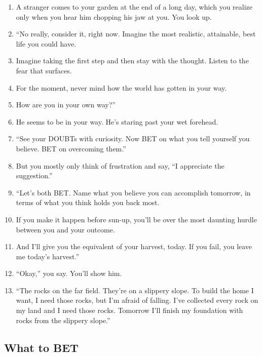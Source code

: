 \documentclass[
]{book}
\providecommand{\tightlist}{%
  \setlength{\itemsep}{0pt}\setlength{\parskip}{0pt}}
\begin{document}
\begin{enumerate}
\def\labelenumi{\arabic{enumi}.}
\setcounter{enumi}{9}
\tightlist
\item
  A stranger comes to your garden at the end of a long day, which you realize only when you hear him chopping his
  jaw at you. You look up.
\item
  ``No really, consider it, right now. Imagine the most realistic,
  attainable, best life you could have.
\item
  Imagine taking the first step and then stay with the thought. Listen to
  the fear that surfaces.
\item
  For the moment, never mind how the world has gotten in your way.
\item
  How are you in your own way?''
\item
  He seems to be in your way. He's staring past your wet forehead.
\item
  ``See your DOUBTs with curiosity. Now BET on what you tell yourself
  you believe. BET on overcoming them.''
\item
  But you mostly only think of frustration and say, ``I appreciate the
  suggestion.''
\item
  ``Let's both BET. Name what you believe you can accomplish
  tomorrow, in terms of what you think holds you back most.
\item
  If you make it happen before sun-up, you'll be over the most daunting
  hurdle between you and your outcome.
\item
  And I'll give you the equivalent of your harvest, today. If you fail, you
  leave me today's harvest.''
\item
  ``Okay,'' you say. You'll show him.
\item
  ``The rocks on the far field. They're on a slippery slope. To build the
  home I want, I need those rocks, but I'm afraid of falling. I've collected
  every rock on my land and I need those rocks. Tomorrow I'll finish my
  foundation with rocks from the slippery slope.''
\end{enumerate}

\hypertarget{what-to-bet}{%
\subsection{What to BET}\label{what-to-bet}}
\end{document}
